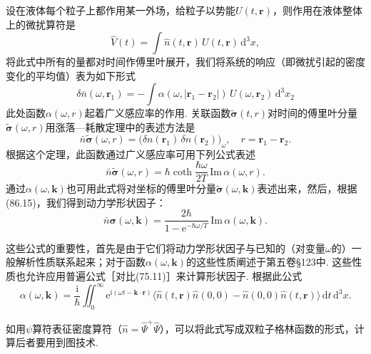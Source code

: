 设在液体每个粒子上都作用某一外场，给粒子以势能$U(t,\bm{r})$，则作用在液体整体上的微扰算符是
\begin{equation}
\hat{V}(t)=\int\hat{n}(t,\bm{r})\,U(t,\bm{r})\,\mathrm{d}^{3}x,
\end{equation}
将此式中所有的量都对时间作傅里叶展开，我们将系统的响应（即微扰引起的密度变化的平均值）表为如下形式
\begin{equation}
\delta\bar{n}(\omega,\bm{r}_{1})=-\int\alpha(\omega,|\bm{r}_{1}-\bm{r}_{2}|)\,U(\omega,\bm{r}_{2})\,\mathrm{d}^{3}x_{2}
\end{equation}
此处函数$\alpha(\omega,r)$起着广义感应率的作用. 关联函数$\tilde{\bm{\sigma}}(t,r)$对时间的傅里叶分量$\tilde{\bm{\sigma}}(\omega,r)$用涨落—耗散定理中的表述方法是
\begin{equation*}
\bar{n}\tilde{\bm{\sigma}}(\omega,r)=\bigl(\delta n(\bm{r}_{1})\,\delta n(\bm{r}_{2})\bigr)_{\omega},\quad r=\bm{r}_{1}-\bm{r}_{2}.
\end{equation*}
根据这个定理，此函数通过广义感应率可用下列公式表述
\begin{equation}
\bar{n}\tilde{\bm{\sigma}}(\omega,r)=\hbar\coth\frac{\hbar\omega}{2T}\,\mathrm{Im}\,\alpha(\omega,r).
\end{equation}
通过$\alpha(\omega,\bm{k})$也可用此式将对坐标的傅里叶分量$\tilde{\bm{\sigma}}(\omega,\bm{k})$表述出来，然后，根据(86.15)，我们得到动力学形状因子：
\begin{equation}
\bar{n}\bm{\sigma}(\omega,\bm{k})=\frac{2\hbar}{1-\mathrm{e}^{-\hbar\omega/T}}\,\mathrm{Im}\,\alpha(\omega,\bm{k}).
\end{equation}

这些公式的重要性，首先是由于它们将动力学形状因子与已知的（对变量$\omega$的）一般解析性质联系起来；对于函数$\alpha(\omega,\bm{k})$的这些性质阐述于第五卷§123中. 这些性质也允许应用普遍公式［对比(75.11)］来计算形状因子. 根据此公式
\begin{equation}
\alpha(\omega,\bm{k})=\frac{\mathrm{i}}{\hbar}\iint_{0}^{\infty}\mathrm{e}^{\mathrm{i}(\omega t-\bm{k}\cdot\bm{r})}\bigl\langle\hat{n}(t,\bm{r})\hat{n}(0,0)-\hat{n}(0,0)\hat{n}(t,\bm{r})\bigr\rangle\,\mathrm{d}t\,\mathrm{d}^{3}x.
\end{equation}

如用$\psi$算符表征密度算符（$\hat{n}=\hat{\varPsi}^{+}\hat{\varPsi}$），可以将此式写成双粒子格林函数的形式，计算后者要用到图技术.

